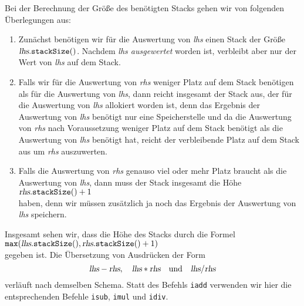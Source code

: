 Bei der Berechnung der Gr\"o{\ss}e des ben\"otigten Stacks gehen wir von folgenden \"Uberlegungen aus:
\begin{enumerate}
\item Zun\"achst ben\"otigen wir f\"ur die Auswertung von \textsl{lhs} einen Stack der Gr\"o{\ss}e
      $\textsl{lhs}.\mathtt{stackSize}()$.  Nachdem \textsl{lhs ausgewertet}  worden ist, verbleibt
      aber nur der Wert von \textsl{lhs} auf dem Stack.
\item Falls wir f\"ur die Auswertung von \textsl{rhs} weniger Platz auf dem Stack ben\"otigen als f\"ur
      die Auswertung von \textsl{lhs}, dann reicht insgesamt der Stack aus, der f\"ur die Auswertung
      von \textsl{lhs} allokiert worden ist, denn das Ergebnis der Auswertung von \textsl{lhs}
      ben\"otigt nur eine Speicherstelle und da die Auswertung von \textsl{rhs} nach Voraussetzung
      weniger Platz auf dem Stack ben\"otigt als die Auswertung von \textsl{lhs} ben\"otigt hat, reicht
      der verbleibende Platz auf dem Stack aus um \textsl{rhs} auszuwerten.
\item Falls die Auswertung von \textsl{rhs} genauso viel oder mehr Platz braucht als die Auswertung von \textsl{lhs},
      dann muss der Stack insgesamt die H\"ohe
      \\[0.2cm]
      \hspace*{1.3cm}
      $\textsl{rhs}.\texttt{stackSize}() + 1$
      \\[0.2cm]
      haben, denn wir m\"ussen zus\"atzlich ja noch das Ergebnis der Auswertung von \textsl{lhs} speichern.
\end{enumerate}
Insgesamt sehen wir, dass die H\"ohe des Stacks durch die Formel
\\[0.2cm]
\hspace*{1.3cm}
$\texttt{max}(\textsl{lhs}.\texttt{stackSize}(), \textsl{rhs}.\texttt{stackSize}() + 1)$
\\[0.2cm]
gegeben ist.
Die \"Ubersetzung von Ausdr\"ucken der Form 
\[ \textsl{lhs} - \textsl{rhs}, \quad\textsl{lhs} * \textsl{rhs} 
   \quad \mbox{und} \quad\textsl{lhs} / \textsl{rhs} 
\]
verl\"auft nach demselben Schema.  Statt des Befehls \texttt{iadd} verwenden wir hier die
entsprechenden Befehle \texttt{isub}, \texttt{imul} und \texttt{idiv}.



